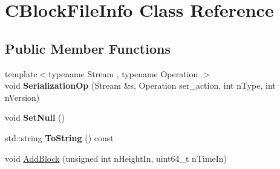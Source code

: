 \hypertarget{class_c_block_file_info}{}\section{C\+Block\+File\+Info Class Reference}
\label{class_c_block_file_info}
\subsection*{Public Member Functions}
\begin{DoxyCompactItemize}
\item 
\mbox{\label{class_c_block_file_info_a5d48a4fe1f8b3903131d121fc14a5a6f}} 
{\footnotesize template$<$typename Stream , typename Operation $>$ }\\void {\bfseries Serialization\+Op} (Stream \&s, Operation ser\+\_\+action, int n\+Type, int n\+Version)
\item 
\mbox{\label{class_c_block_file_info_a21bd4f8e92c47646737fc57446a86cc2}} 
void {\bfseries Set\+Null} ()
\item 
\mbox{\label{class_c_block_file_info_a2754dd93534e2fda8674ffc5d007611e}} 
std\+::string {\bfseries To\+String} () const
\item 
void \mbox{\hyperlink{class_c_block_file_info_a66867569ffe06068b8c6eb1139934fbf}{Add\+Block}} (unsigned int n\+Height\+In, uint64\+\_\+t n\+Time\+In)
\end{DoxyCompactItemize}
